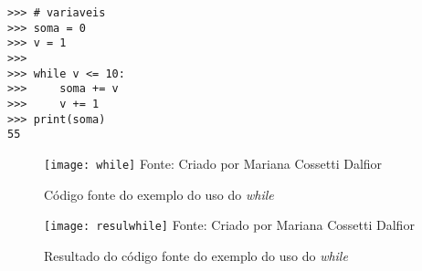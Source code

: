 \begin{lstlisting}
>>> # variaveis
>>> soma = 0
>>> v = 1
>>> 
>>> while v <= 10:
>>> 	soma += v
>>> 	v += 1
>>> print(soma)
55
\end{lstlisting}	

\begin{figure}[H]
	\begin{center}
		\caption{C\'{o}digo fonte do exemplo do uso do \textsl{while}} \label{fontewhile}
		\texttt{[image: while]} 
		\newline
		Fonte: Criado por Mariana Cossetti Dalfior
	\end{center}
\end{figure}

\begin{figure}[H]
	\begin{center}
		\caption{Resultado do c\'{o}digo fonte do exemplo do uso do \textsl{while}} \label{resulwhile}
		\texttt{[image: resulwhile]} 
		\newline
		Fonte: Criado por Mariana Cossetti Dalfior
	\end{center}
\end{figure}